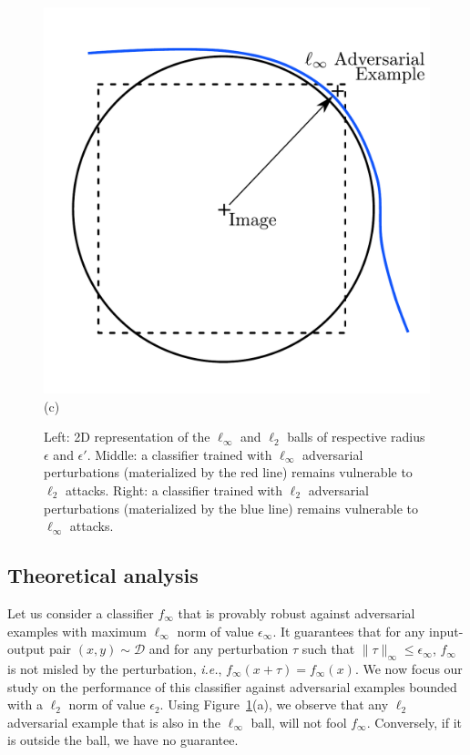 \begin{figure}[ht]
\begin{minipage}{.32\linewidth}
  \end{minipage}
  \begin{minipage}{.32\linewidth}
      \centering
      \includegraphics[scale=0.15]{sections/appendix/ecml_rat/graphs/BallAdversarialLinfDecisionBoundary.pdf}\\(c)
  \end{minipage}
    \caption{ Left: 2D representation of the $\ell_\infty$ and $\ell_2$ balls of respective radius $\epsilon$ and $\epsilon'$. 
    Middle: a classifier trained with $\ell_\infty$ adversarial perturbations  (materialized by the red line) remains vulnerable to $\ell_2$ attacks. 
    Right: a classifier trained with $\ell_2$ adversarial perturbations (materialized by the blue line) remains vulnerable to $\ell_\infty$ attacks.}
  \label{figure:balls}
\end{figure}%

\subsection{Theoretical analysis}

Let us consider a classifier $f_{\infty}$ that is provably robust against adversarial examples with maximum $\ell_\infty$ norm of value $\epsilon_\infty$. It guarantees that for any input-output pair $(x,y) \sim \mathcal D$ and for any perturbation $\tau$ such that $\lVert\tau\rVert_\infty \leq \epsilon_\infty$, $f_{\infty}$ is not misled by the perturbation, \emph{i.e.}, $f_{\infty}(x + \tau) = f_{\infty}(x)$.
We now focus our study on the performance of this classifier against adversarial examples bounded with a $\ell_2$ norm of value $\epsilon_2$. Using Figure~\ref{figure:balls}(a), we observe that any $\ell_2$ adversarial example that is also in the $\ell_\infty$ ball, will not fool $f_{\infty}$. Conversely, if it is outside the ball, we have no guarantee.

